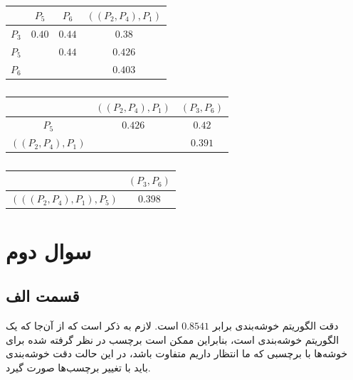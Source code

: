 \documentclass[12pt, a4paper]{article}
\begin{document}
\begin{latin}
\begin{table}[h]
\begin{subtable}{0.45\linewidth}
\begin{tabular}{c|c|c|c}
                      & $P_5$  & $P_6$  & $((P_2, P_4), P_1)$         \\
                \hline
                $P_3$ & $0.40$ & \cellcolor{purple!30}$0.44$ & $0.38$                      \\
                \hline
                $P_5$ &        & $0.44$ & $0.426$                     \\
                \hline
                $P_6$ &        &        & $0.403$                     \\
            \end{tabular}
        \end{subtable}
        \hfill
        \begin{subtable}{0.45\linewidth}
            \caption{}
            \begin{tabular}{c|c|c}
                                    & $((P_2, P_4), P_1)$ & $(P_3, P_6)$ \\
                \hline
                $P_5$               & \cellcolor{purple!30}$0.426$             & $0.42$      \\
                \hline
                $((P_2, P_4), P_1)$ &                     & $0.391$
            \end{tabular}
        \end{subtable}
        \newline
        \begin{subtable}{0.45\linewidth}
            \caption{}
            \begin{tabular}{c|c}
                                           & $(P_3, P_6)$ \\
                \hline
                $(((P_2, P_4), P_1), P_5)$ & \cellcolor{purple!30}$0.398$
            \end{tabular}
        \end{subtable}
    \end{table}
\end{latin}

\clearpage
\thispagestyle{fancy}


\section*{سوال دوم}

\subsection*{قسمت الف}

دقت الگوریتم خوشه‌بندی برابر $0.8541$ است. لازم به ذکر است که از آن‌جا که
 یک الگوریتم خوشه‌بندی است، بنابراین ممکن است برچسب در نظر گرفته شده
برای خوشه‌ها با برچسبی که ما انتظار داریم متفاوت باشد، در این حالت دقت خوشه‌بندی
 باید با تغییر برچسب‌ها صورت گیرد.
\end{document}
